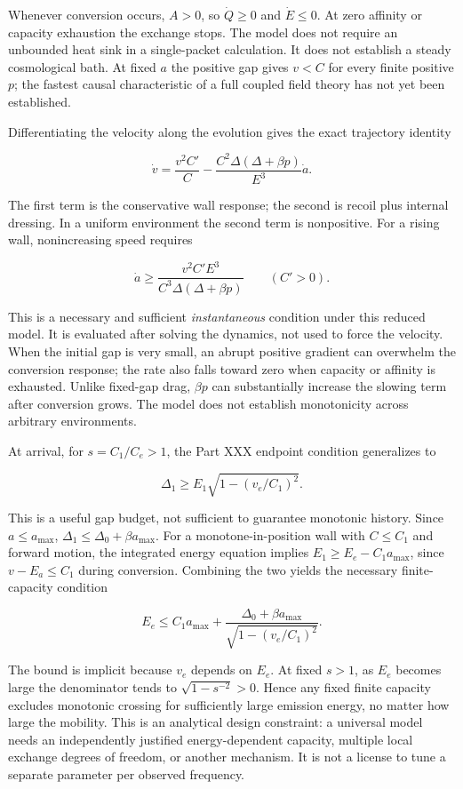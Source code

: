 \documentclass[
  11pt,
  twoside]{article}
\begin{document}
Whenever conversion occurs, \(A>0\), so \(\dot Q\geq0\) and
\(\dot E\leq0\). At zero affinity or capacity exhaustion the exchange
stops. The model does not require an unbounded heat sink in a
single-packet calculation. It does not establish a steady cosmological
bath. At fixed \(a\) the positive gap gives \(v<C\) for every finite
positive \(p\); the fastest causal characteristic of a full coupled
field theory has not yet been established.

Differentiating the velocity along the evolution gives the exact
trajectory identity

\[\boxed{\dot v=\frac{v^2C'}{C}-\frac{C^2\Delta(\Delta+\beta p)}{E^3}\dot a.}\]

The first term is the conservative wall response; the second is recoil
plus internal dressing. In a uniform environment the second term is
nonpositive. For a rising wall, nonincreasing speed requires

\[\dot a\geq\frac{v^2 C'E^3}{C^3\Delta(\Delta+\beta p)}\qquad(C'>0).\]

This is a necessary and sufficient \emph{instantaneous} condition under
this reduced model. It is evaluated after solving the dynamics, not used
to force the velocity. When the initial gap is very small, an abrupt
positive gradient can overwhelm the conversion response; the rate also
falls toward zero when capacity or affinity is exhausted. Unlike
fixed-gap drag, \(\beta p\) can substantially increase the slowing term
after conversion grows. The model does not establish monotonicity across
arbitrary environments.

At arrival, for \(s=C_1/C_e>1\), the Part XXX endpoint condition
generalizes to

\[\Delta_1\geq E_1\sqrt{1-(v_e/C_1)^2}.\]

This is a useful gap budget, not sufficient to guarantee monotonic
history. Since \(a\leq a_{\max}\),
\(\Delta_1\leq\Delta_0+\beta a_{\max}\). For a monotone-in-position wall
with \(C\leq C_1\) and forward motion, the integrated energy equation
implies \(E_1\geq E_e-C_1 a_{\max}\), since \(v-E_a\leq C_1\) during
conversion. Combining the two yields the necessary finite-capacity
condition

\[\boxed{E_e\leq C_1 a_{\max}+\frac{\Delta_0+\beta a_{\max}}{\sqrt{1-(v_e/C_1)^2}}.}\]

The bound is implicit because \(v_e\) depends on \(E_e\). At fixed
\(s>1\), as \(E_e\) becomes large the denominator tends to
\(\sqrt{1-s^{-2}}>0\). Hence any fixed finite capacity excludes
monotonic crossing for sufficiently large emission energy, no matter how
large the mobility. This is an analytical design constraint: a universal
model needs an independently justified energy-dependent capacity,
multiple local exchange degrees of freedom, or another mechanism. It is
not a license to tune a separate parameter per observed frequency.
\end{document}
